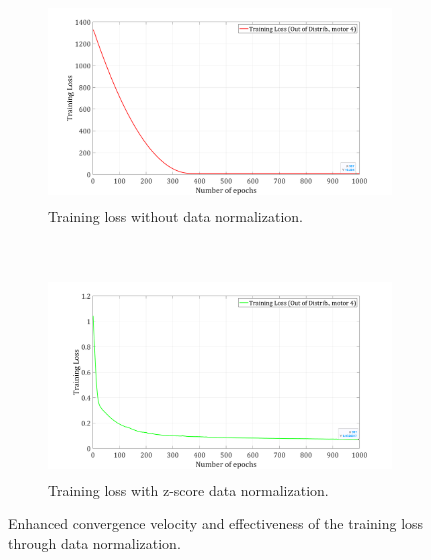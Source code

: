\documentclass{ifacconf}
\begin{document}
\begin{figure}[t!]
	\centering
	\begin{subfigure}[b]{1.\columnwidth}
		\centering
		\includegraphics[height=2.1in]{./pictures/applications/Unormalized.png}
		\caption{Training loss without data normalization.}
	\end{subfigure}%
	~ 
	\begin{subfigure}[b]{1.\columnwidth}
		\centering
		\includegraphics[height=2.1in]{./pictures/applications/Normalized.png}
		\caption{Training loss with z-score data normalization.}
	\end{subfigure}
	\caption{Enhanced  convergence velocity and effectiveness of the training loss through data normalization.}
	\label{trainingloss}
\end{figure}
\end{document}
